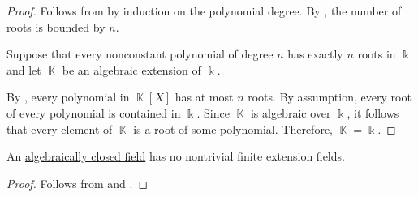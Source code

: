 \begin{proof}
   Follows from  by induction on the polynomial degree. By , the number of roots is bounded by \( n \).

   Suppose that every nonconstant polynomial of degree \( n \) has exactly \( n \) roots in \( \Bbbk \) and let \( \BbbK \) be an algebraic extension of \( \Bbbk \).

  By , every polynomial in \( \BbbK[X] \) has at most \( n \) roots. By assumption, every root of every polynomial is contained in \( \Bbbk \). Since \( \BbbK \) is algebraic over \( \Bbbk \), it follows that every element of \( \BbbK \) is a root of some polynomial. Therefore, \( \BbbK = \Bbbk \).
\end{proof}

\begin{proposition}\label{thm:no_finite_extensions_of_closed_fields}
  An \hyperref[def:algebraically_closed_field]{algebraically closed field} has no nontrivial finite extension fields.
\end{proposition}
\begin{proof}
  Follows from  and .
\end{proof}
